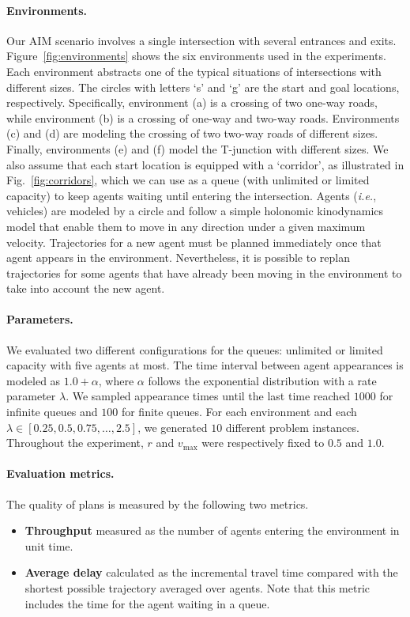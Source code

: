 \documentclass[letterpaper]{article} %
\def\ie{{\it i.e.}}
\begin{document}
\paragraph{Environments.}
Our AIM scenario involves a single intersection with several entrances and exits. Figure~\ref{fig:environments} shows the six environments used in the experiments. Each environment abstracts one of the typical situations of intersections with different sizes. The circles with letters `s' and `g' are the start and goal locations, respectively. Specifically, environment (a) is a crossing of two one-way roads, while environment (b) is a crossing of one-way and two-way roads. Environments (c) and (d) are modeling the crossing of two two-way roads of different sizes. Finally, environments (e) and (f) model the T-junction with different sizes. We also assume that each start location is equipped with a `corridor', as illustrated in Fig.~\ref{fig:corridors}, which we can use as a queue (with unlimited or limited capacity) to keep agents waiting until entering the intersection. Agents (\ie, vehicles) are modeled by a circle and follow a simple holonomic kinodynamics model that enable them to move in any direction under a given maximum velocity. Trajectories for a new agent must be planned immediately once that agent appears in the environment. Nevertheless, it is possible to replan trajectories for some agents that have already been moving in the environment to take into account the new agent.



\paragraph{Parameters.}
We evaluated two different configurations for the queues: unlimited or limited capacity with five agents at most. The time interval between agent appearances is modeled as $1.0 + \alpha$, where $\alpha$ follows the exponential distribution with a rate parameter $\lambda$. We sampled appearance times until the last time reached $1000$ for infinite queues and $100$ for finite queues. For each environment and each $\lambda\in [0.25, 0.5, 0.75,\dots,2.5]$, we generated $10$ different problem instances. Throughout the experiment, $r$ and $v_{\mathrm{max}}$ were respectively fixed to $0.5$ and $1.0$.

\paragraph{Evaluation metrics.}
The quality of plans is measured by the following two metrics.
\begin{itemize}
\item \textbf{Throughput} measured as the number of agents entering the environment in unit time.
\item \textbf{Average delay} calculated as the incremental travel time compared with the shortest possible trajectory averaged over agents. Note that this metric includes the time for the agent waiting in a queue.
\end{itemize}
\end{document}
